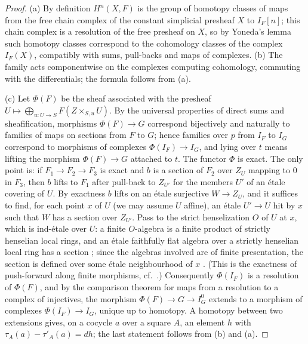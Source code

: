\begin{proof}
(a) By definition $H^n(X,F)$ is the group of homotopy classes of maps from the free chain complex of
the constant simplicial presheaf $X$ to $I_F[n]$; this chain complex is a resolution of the free
presheaf on $X$, so by Yoneda's lemma such homotopy classes correspond to the cohomology classes of
the complex $I_F(X)$, compatibly with sums, pull-backs and maps of complexes. (b) The family acts
componentwise on the complexes computing cohomology, commuting with the differentials; the formula
follows from (a).

(c) Let $\Phi(F)$ be the sheaf associated with the presheaf $U\mapsto\bigoplus_{u\colon U\to S}
F(Z\times_{S,u}U)$. By the universal properties of direct sums and sheafification, morphisms
$\Phi(F)\to G$ correspond bijectively and naturally to families of maps on sections from $F$ to $G$;
hence families over $p$ from $I_F$ to $I_G$ correspond to morphisms of complexes $\Phi(I_F)\to I_G$,
and lying over $t$ means lifting the morphism $\Phi(F)\to G$ attached to $t$. The functor $\Phi$ is
exact. The only point is: if $F_1\to F_2\to F_3$ is exact and $b$ is a section of $F_2$ over $Z_U$
mapping to $0$ in $F_3$, then $b$ lifts to $F_1$ after pull-back to $Z_{U'}$ for the members $U'$ of
an \'etale covering of $U$. By exactness $b$ lifts on an \'etale surjective $W\to Z_U$, and it suffices
to find, for each point $x$ of $U$ (we may assume $U$ affine), an \'etale $U'\to U$ hit by $x$ such
that $W$ has a section over $Z_{U'}$. Pass to the strict henselization $O$ of $U$ at $x$, which is
ind-\'etale over $U$: a finite $O$-algebra is a finite product of strictly henselian local rings, and
an \'etale faithfully flat algebra over a strictly henselian local ring has a section
\cite[Ch.~I, \S4]{Milne1980}; since the algebras involved are of finite presentation,
the section is defined over some \'etale neighbourhood of $x$ \cite[8.8.2]{Grothendieck1967}. (This is
the exactness of push-forward along finite morphisms, cf.\ \cite[Exp.~VIII, 5.5]{ArtinGrothendieckVerdier1972}.)
Consequently $\Phi(I_F)$ is a resolution of $\Phi(F)$, and by the comparison theorem for maps from a
resolution to a complex of injectives, the morphism $\Phi(F)\to G\to I_G^0$ extends to a morphism of
complexes $\Phi(I_F)\to I_G$, unique up to homotopy. A homotopy between two extensions gives, on a
cocycle $a$ over a square $A$, an element $h$ with $\tau_A(a)-\tau'_A(a)=dh$; the last statement follows
from (b) and (a).
\end{proof}

